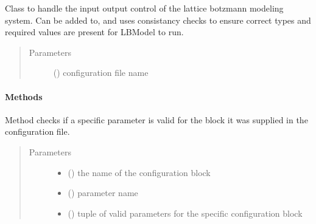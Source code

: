 \documentclass[letterpaper,10pt,english]{sphinxmanual}
\begin{document}
\begin{fulllineitems}
\label{\detokenize{index:lb_colloids.LB.LBIO.Config}}
Class to handle the input output control of the lattice botzmann modeling
system. Can be added to, and uses consistancy checks to ensure correct
types and required values are present for LBModel to run.
\begin{quote}\begin{description}
\item[{Parameters}] \leavevmode
{} () \textendash{} configuration file name

\end{description}\end{quote}
\paragraph{Methods}

\begin{fulllineitems}
\label{\detokenize{index:lb_colloids.LB.LBIO.Config.check_if_valid}}
Method checks if a specific parameter is valid for the block it was supplied
in the configuration file.
\begin{quote}\begin{description}
\item[{Parameters}] \leavevmode\begin{itemize}
\item {} 
 () \textendash{} the name of the configuration block

\item {} 
 () \textendash{} parameter name

\item {} 
 () \textendash{} tuple of valid parameters for the specific configuration block

\end{itemize}

\end{description}\end{quote}


\end{fulllineitems}
\end{fulllineitems}
\end{document}

